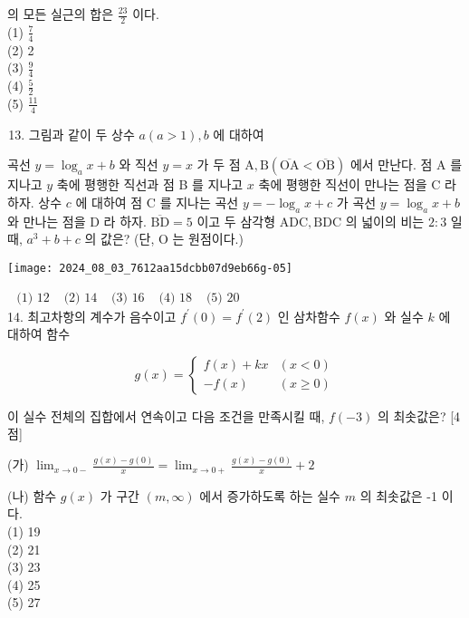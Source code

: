 \documentclass[10pt]{article}
\begin{document}
의 모든 실근의 합은 \(\frac{23}{2}\) 이다.\\
(1) \(\frac{7}{4}\)\\
(2) 2\\
(3) \(\frac{9}{4}\)\\
(4) \(\frac{5}{2}\)\\
(5) \(\frac{11}{4}\)

\begin{enumerate}
  \setcounter{enumi}{12}
  \item 그림과 같이 두 상수 \(a(a>1), b\) 에 대하여
\end{enumerate}

곡선 \(y=\log _{a} x+b\) 와 직선 \(y=x\) 가 두 점 \(\mathrm{A}, \mathrm{B}(\overline{\mathrm{OA}}<\overline{\mathrm{OB}})\) 에서 만난다. 점 A 를 지나고 \(y\) 축에 평행한 직선과 점 B 를 지나고 \(x\) 축에 평행한 직선이 만나는 점을 C 라 하자. 상수 \(c\) 에 대하여 점 C 를 지나는 곡선 \(y=-\log _{a} x+c\) 가 곡선 \(y=\log _{a} x+b\) 와 만나는 점을 D 라 하자. \(\overline{\mathrm{BD}}=5\) 이고 두 삼각형 \(\mathrm{ADC}, \mathrm{BDC}\) 의 넓이의 비는 \(2: 3\) 일 때, \(a^{3}+b+c\) 의 값은? (단, O 는 원점이다.)

\begin{center}
\texttt{[image: 2024\_08\_03\_7612aa15dcbb07d9eb66g-05]}
\end{center}

\(\begin{array}{lllll}\text { (1) } 12 & \text { (2) } 14 & \text { (3) } 16 & \text { (4) } 18 & \text { (5) } 20\end{array}\)\\
14. 최고차항의 계수가 음수이고 \(f^{\prime}(0)=f^{\prime}(2)\) 인 삼차함수 \(f(x)\) 와 실수 \(k\) 에 대하여 함수

\[
g(x)= \begin{cases}f(x)+k x & (x<0) \\ -f(x) & (x \geq 0)\end{cases}
\]

이 실수 전체의 집합에서 연속이고 다음 조건을 만족시킬 때, \(f(-3)\) 의 최솟값은? [4점]

(가) \(\lim _{x \rightarrow 0-} \frac{g(x)-g(0)}{x}=\lim _{x \rightarrow 0+} \frac{g(x)-g(0)}{x}+2\)

(나) 함수 \(g(x)\) 가 구간 \((m, \infty)\) 에서 증가하도록 하는 실수 \(m\) 의 최솟값은 -1 이다.\\
(1) 19\\
(2) 21\\
(3) 23\\
(4) 25\\
(5) 27
\end{document}
